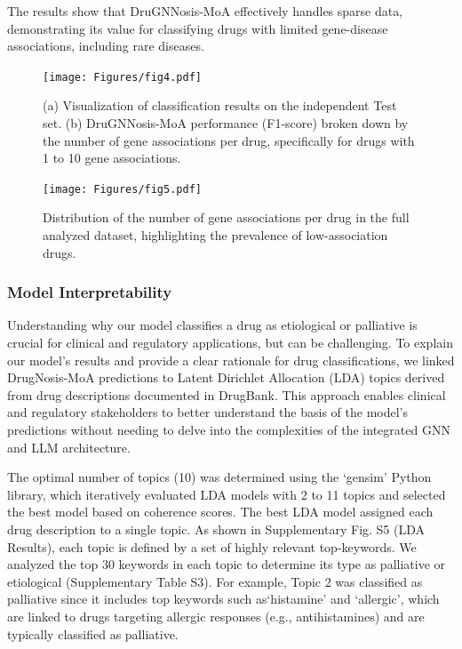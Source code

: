 \documentclass[journal,twoside,web]{ieeecolor}
\begin{document}
The results show that DruGNNosis-MoA effectively handles sparse data, demonstrating its value for classifying drugs with limited gene-disease associations, including rare diseases.


\begin{figure}
\centering
   \texttt{[image: Figures/fig4.pdf]}
   \caption{
            (a) Visualization of classification results on the independent Test set.
            (b) DruGNNosis-MoA performance (F1-score) broken down by the number of gene associations per drug, specifically for drugs with 1 to 10 gene associations.
            }
\label{fig:class}
\end{figure}



\begin{figure}
\centering
   \texttt{[image: Figures/fig5.pdf]}
   \caption{
             Distribution of the number of gene associations per drug in the full analyzed dataset, highlighting the prevalence of low-association drugs.
            }
\label{fig:genes_per_drug}
\end{figure}




\subsubsection{Model Interpretability}
\label{sec:sparse_data_evaluation}

Understanding why our model classifies a drug as etiological or palliative is crucial for clinical and regulatory applications, but can be challenging. 
To explain our model's results and provide a clear rationale for drug classifications, we linked DrugNosis-MoA predictions to Latent Dirichlet Allocation (LDA) topics derived from drug descriptions documented in DrugBank.
This approach enables clinical and regulatory stakeholders to better understand the basis of the model’s predictions without needing to delve into the complexities of the integrated GNN and LLM architecture.

The optimal number of topics (10) was determined using the `gensim' Python library, which iteratively evaluated LDA models with 2 to 11 topics and selected the best model based on coherence scores. 
The best LDA model assigned each drug description to a single topic.
As shown in Supplementary Fig. S5 (LDA Results), each topic is defined by a set of highly relevant top-keywords. 
We analyzed the top 30 keywords in each topic to determine its type as palliative or etiological (Supplementary Table S3). For example, Topic 2 was classified as palliative since it includes top keywords such as`histamine' and `allergic', which are linked to drugs targeting allergic responses (e.g., antihistamines) and are typically classified as palliative.
\end{document}
